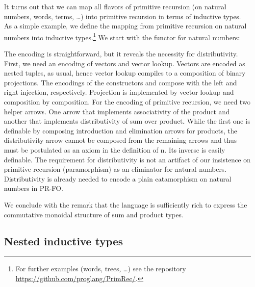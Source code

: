 \documentclass[a4paper,USenglish,cleveref, autoref, thm-restate]{lipics-v2021}
\begin{document}
It turns out that we can map all flavors of primitive recursion (on
natural numbers, words, terms, \dots) into primitive recursion in terms
of inductive types.
As a simple example, we define the mapping from primitive recursion on
natural numbers into inductive types.\footnote{For further examples
  (words, trees, \dots)
  see the repository \url{https://github.com/proglang/PrimRec/}.} We
start with the functor {\AGNat} for natural numbers:
\ccDefGNat

The encoding is straightforward, but it reveals the necessity for
distributivity. First, we need an 
encoding of vectors and vector lookup. Vectors are encoded as nested
tuples, as usual, hence vector lookup compiles to a composition of
binary projections.
\ccFunMkvec
\ccDefNatToInd
The encodings of the constructors {\ACZ} and {\ACS} compose {\Acon} with the left and right
injection, respectively. Projection is implemented by vector lookup
and composition by composition. For
the encoding of primitive recursion, we need two helper arrows. One
arrow that implements associativity of the product and another that
implements distributivity of sum over product. While the first one is
definable by composing introduction and elimination arrows for
products,  the distributivity arrow cannot be composed from the
remaining arrows and thus must be postulated as an axiom in the
definition of {\APR n}. Its inverse is easily definable.
\ccFunAssocDist
The requirement for distributivity is not an artifact of our
insistence on primitive recursion (paramorphism) as an eliminator for
natural numbers. Distributivity is already needed to encode a plain
catamorphism on natural numbers in PR-FO.

We conclude with the remark that the language is sufficiently rich to
express the commutative monoidal structure of sum and product types.

\subsection{Nested inductive types}
\label{sec:closer-look-at}
\end{document}
